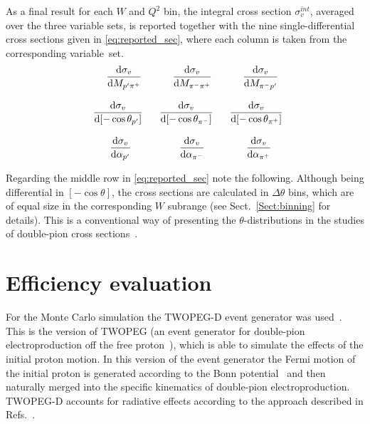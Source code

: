 

As a final result for each $W$ and $Q^{2}$ bin, the integral cross section $\sigma_{v}^{int}$, averaged over the three variable sets, is reported together with the nine single-differential cross sections given in \eqref{eq:reported_sec}, where each column is taken from the corresponding variable~set.
\begin{equation}
\begin{aligned}
&~~~~~~\frac{\textrm{\textrm{d}}\sigma_{v}}{\textrm{d}M_{p'\pi^{+}}}&&~~~~~~\frac{\textrm{d}\sigma_{v}}{\textrm{d}M_{\pi^{-}\pi^{+}}}&&~~~~~~\frac{\textrm{d}\sigma_{v}}{\textrm{d}M_{\pi^{-}p'}}\\[8pt] 
&~~\frac{\textrm{d}\sigma_{v}}{\textrm{d}[-\cos\theta_{p'}]}&&~~\frac{\textrm{d}\sigma_{v}}{\textrm{d}[-\cos\theta_{\pi^{-}}]}&&~~\frac{\textrm{d}\sigma_{v}}{\textrm{d}[-\cos\theta_{\pi^{+}}]}\\[8pt] 
&~~~~~~~\frac{\textrm{d}\sigma_{v}}{\textrm{d}\alpha_{p'}}&&~~~~~~~~\frac{\textrm{d}\sigma_{v}}{\textrm{d}\alpha_{\pi^{-}}}&&~~~~~~~\frac{\textrm{d}\sigma_{v}}{\textrm{d}\alpha_{\pi^{+}}}
\end{aligned}
\label{eq:reported_sec}
\end{equation}

Regarding the middle row in \eqref{eq:reported_sec} note the following. Although being differential in $[-\cos\theta]$, the cross sections are calculated in $\Delta \theta$ bins, which are of equal size in the corresponding $W$ subrange (see Sect.~\ref{Sect:binning} for details). This is a conventional way of presenting the $\theta$-distributions in the studies of double-pion cross sections~\cite{Rip_an_note:2002,Ripani:2002ss,Fed_an_note:2007,Fedotov:2008aa,Isupov:2017lnd,Arjun,Fed_an_note:2017,Fed_paper_2018}.

\section{Efficiency evaluation}
\label{Sect:eff_eval}


For the Monte Carlo simulation the TWOPEG-D event generator was used~\cite{twopeg-d}. This is the version of TWOPEG (an event generator for double-pion electroproduction off the free proton~\cite{twopeg}), which is able to simulate the effects of the initial proton motion. In this version of the event generator the Fermi motion of the initial proton is generated according to the Bonn potential~\cite{Machleidt:1987hj} and then naturally merged into the specific kinematics of double-pion electroproduction. TWOPEG-D accounts for radiative effects according to the approach described in Refs.~\cite{Mo:1968cg,twopeg}.

